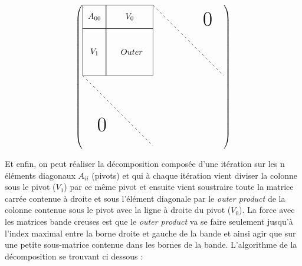 \documentclass{article}[11pt]
\begin{document}
\begin{minipage}{0.5\textwidth}
\newcommand{\scale}{1}
\[
    \left(\begin{gathered}
    \tikzpicture[every node/.style={anchor=south west}]
      \node[minimum width=1cm,minimum height=1cm] at (\fpeval{0*\scale},\fpeval{5*\scale}) { $A_{00}$ };
      \node[minimum width=1cm,minimum height=1cm] at (\fpeval{1.5*\scale},\fpeval{5*\scale}) { $V_0$ };
      \node[minimum width=1cm,minimum height=1cm] at (\fpeval{0*\scale},\fpeval{3.5*\scale}) { $V_1$ };
      \node[minimum width=1cm,minimum height=1cm] at (\fpeval{1.5*\scale},\fpeval{3.5*\scale}) { $Outer$ };
      \node[minimum width=0.1cm,minimum height=0.1cm] at (\fpeval{0.5*\scale},\fpeval{0.5*\scale}) { \Huge{0} };
      \node[minimum width=0.1cm,minimum height=0.1cm] at (\fpeval{5*\scale},\fpeval{5*\scale}) { \Huge{0} };
      \draw[dashed] (\fpeval{0*\scale},\fpeval{3*\scale}) -- (\fpeval{3*\scale},\fpeval{0*\scale});
      \draw[dashed] (\fpeval{3*\scale},\fpeval{6*\scale}) -- (\fpeval{6*\scale},\fpeval{3*\scale});
      \draw (0,\fpeval{6*\scale}) rectangle (\fpeval{1*\scale},\fpeval{5*\scale});
      \draw (0,\fpeval{3*\scale}) rectangle (\fpeval{1*\scale},\fpeval{5*\scale});
      \draw (\fpeval{1*\scale},\fpeval{6*\scale}) rectangle (\fpeval{3*\scale},\fpeval{5*\scale});
      \draw (\fpeval{1*\scale},\fpeval{5*\scale}) rectangle (\fpeval{3*\scale},\fpeval{3*\scale});
    \endtikzpicture
    \end{gathered}\right)
\]
\end{minipage}
\begin{minipage}{0.5\textwidth}
        Et enfin, on peut réaliser la décomposition composée d'une itération sur les n éléments diagonaux $A_{ii}$ (pivots) et qui à chaque itération vient diviser la colonne sous le pivot ($V_1$) par ce même pivot et ensuite vient soustraire toute la matrice carrée contenue à droite et sous l'élément diagonale par le \textit{outer product} de la colonne contenue sous le pivot avec la ligne à droite du pivot ($V_0$). La force avec les matrices bande creuses est que le \textit{outer product} va se faire seulement jusqu'à l'index maximal entre la borne droite et gauche de la bande et ainsi agir que sur une petite sous-matrice contenue dans les bornes de la bande. L'algorithme de la décomposition se trouvant ci dessous :
\end{minipage}


\end{document}
